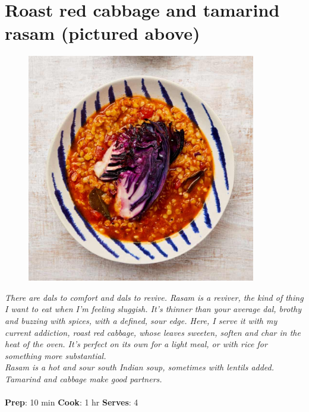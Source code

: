 \documentclass{book}
\begin{document}
\section{Roast red cabbage and tamarind rasam (pictured above)}
\begin{figure}
\centering\includegraphics[width=10cm,height=10cm,keepaspectratio]{Recipe_Pictures/Roast_red_cabbage_and_tamarind_rasam_(pictured_above).png}
\end{figure}
\emph{There are dals to comfort and dals to revive. Rasam is a reviver, the kind of thing I want to eat when I’m feeling sluggish. It’s thinner than your average dal, brothy and buzzing with spices, with a defined, sour edge. Here, I serve it with my current addiction, roast red cabbage, whose leaves sweeten, soften and char in the heat of the oven. It’s perfect on its own for a light meal, or with rice for something more substantial.\\ 
Rasam is a hot and sour south Indian soup, sometimes with lentils added. Tamarind and cabbage make good partners.}\\\\ 
\textbf{Prep}: 10 min
\textbf{Cook}: 1 hr
\textbf{Serves}: 4
\end{document}
